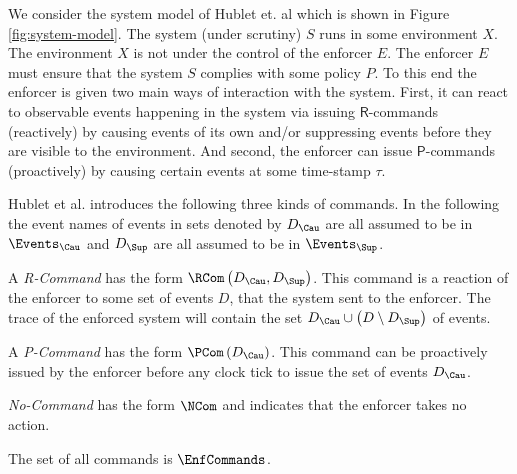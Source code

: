 We consider the system model of Hublet et. al \cite{whyenf} which is shown
in Figure \ref{fig:system-model}.
The system (under scrutiny) $S$ runs in some environment $X$.
The environment $X$ is not under the control of the enforcer $E$.
The enforcer $E$ must ensure that the system $S$ complies with some
policy $P$. To this end the enforcer is given two main ways of interaction
with the system. First, it can react to observable events happening in the system
via issuing $\mathsf{R}$-commands (reactively) by causing events of its own
and/or suppressing events before they are visible to the environment.
And second, the enforcer can issue $\mathsf{P}$-commands (proactively)
by causing certain events at some time-stamp $\tau$.


Hublet et al. \cite{whyenf} introduces the following three kinds of commands.
In the following the event names of events in sets denoted by
$D_\Cau$ are all assumed to be in $\Events_{\Cau}$ and
$D_\Sup$ are all assumed to be in $\Events_{\Sup}$.

\begin{definition}
    \label{def:enf-r-cmd}
    A \emph{R-Command} has the form
    $\RCom\left(D_{\Cau}, D_{\Sup}\right)$.
    This command is a reaction of the enforcer to some set of events $D$,
    that the system sent to the enforcer.
    The trace of the enforced system will contain the set
    $D_{\Cau} \cup \left(D \setminus D_{\Sup} \right)$ of events.
\end{definition}

\begin{definition}
    \label{def:enf-p-cmd}
    A \emph{P-Command} has the form
    $\PCom \left( D_{\Cau} \right)$.
    This command can be proactively issued by the enforcer before any
    clock tick to issue the set of events $D_{\Cau}$.
\end{definition}

\begin{definition}
    \label{def:enf-no-cmd}
    \emph{No-Command} has the form $\NCom$ and indicates that the enforcer takes
    no action.
\end{definition}

\begin{definition}
    The set of all commands is $\EnfCommands$.
\end{definition}

